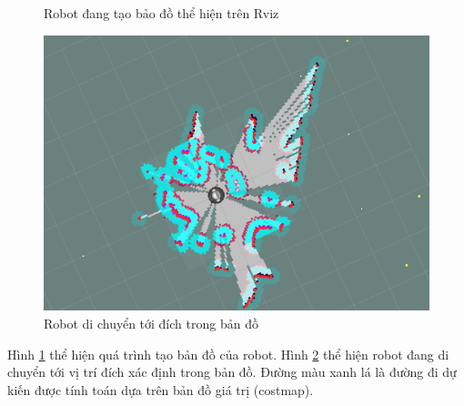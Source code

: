 \begin{figure}[htbp]
    \centering
    \caption{Robot đang tạo bảo đồ thể hiện trên Rviz}
    \label{fig:mapping}
\end{figure}

\begin{figure}[htbp]
    \centering
    \includegraphics[width=0.6\linewidth]{figures/RB_navigation.png}
    \caption{Robot di chuyển tới đích trong bản đồ}
    \label{fig:navigation}
\end{figure}

Hình \ref{fig:mapping} thể hiện quá trình tạo bản đồ của robot.
Hình \ref{fig:navigation} thể hiện robot đang di chuyển tới vị trí đích xác định trong bản đồ. Đường màu xanh lá là đường đi dự kiến được tính toán dựa trên bản đồ giá trị (costmap).

